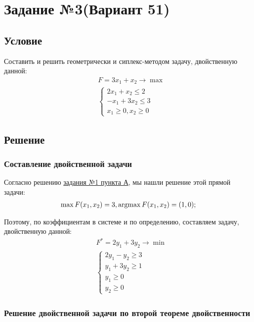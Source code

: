 \section{Задание №3(Вариант 51)}\label{03-lab}
\subsection{Условие}\label{03-lab-condition}

Составить и решить геометрически и сиплекс-методом задачу, двойственную данной:
\begin{align*}
     & F = 3x_1 + x_2 \to \max \\
     & \begin{cases}
           2x_1 + x_2 \leq 2  \\
           -x_1 + 3x_2 \leq 3 \\
           x_1 \geq 0, x_2 \geq 0
       \end{cases}
\end{align*}

\subsection{Решение}\label{03-lab-solution}

\subsubsection{Составление двойственной задачи}
Согласно решению \hyperref[01-lab-a-answer]{задания №1 пункта А}, мы нашли решение этой прямой задачи:
\begin{align*}
    \max F(x_1, x_2) = 3, \operatorname*{argmax} F(x_1, x_2) = (1, 0); \\
\end{align*}

Поэтому, по коэффициентам в системе и по определению, составляем задачу, двойственную данной:
\begin{align*}
     & F^{*} = 2y_1 + 3y_2 \to \min \\
     & \begin{cases}
           2y_1 - y_2 \geq 3 \\
           y_1 + 3y_2 \geq 1 \\
           y_1 \geq 0        \\
           y_2 \geq 0
       \end{cases}
\end{align*}

\subsubsection{Решение двойственной задачи по второй теореме двойственности}

